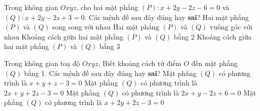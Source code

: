 \begin{ex}%
	Trong không gian $Oxyz$, cho hai mặt phẳng $(P)\colon x+2y-2z-6=0$ và $(Q)\colon x+2y-2z+3=0$. Các mệnh đề sau đây đúng hay \textbf{sai}?
	\choiceTF
	{\True Hai mặt phẳng $(P)$ và $(Q)$ song song với nhau}
	{Hai mặt phẳng $(P)$ và $(Q)$ vuông góc với nhau}
	{Khoảng cách giữa hai mặt phẳng $(P)$ và $(Q)$ bằng $2$}
	{\True Khoảng cách giữa hai mặt phẳng $(P)$ và $(Q)$ bằng $3$}
\end{ex}

\begin{ex}%
	Trong không gian toạ độ $Oxyz$, Biết khoảng cách từ điểm $O$ đến mặt phẳng $(Q)$ bằng 1. Các mệnh đề sau đây đúng hay \textbf{sai}?
	\choiceTF
	{Mặt phẳng $(Q)$ có phương trình là $x + y + z-3 = 0$}
	{\True Mặt phẳng $(Q)$ có phương trình là $2x + y + 2z-3 = 0$}
	{Mặt phẳng $(Q)$ có phương trình là $2x + y- 2z + 6 = 0$}
	{\True Mặt phẳng $(Q)$ có phương trình là $x + 2y + 2z-3= 0$}
\end{ex}

